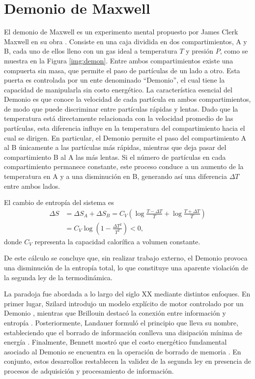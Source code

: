 \section{Demonio de Maxwell}

El demonio de Maxwell es un experimento mental propuesto por James Clerk Maxwell en su obra \cite{Maxwell_1871}. Consiste en una caja dividida en dos compartimientos, A y B, cada uno de ellos lleno con un gas ideal a temperatura $T$ y presión $P$, como se muestra en la Figura \ref{img:demon}. Entre ambos compartimientos existe una compuerta sin masa, que permite el paso de partículas de un lado a otro. Esta puerta es controlada por un ente denominado ``Demonio'', el cual tiene la capacidad de manipularla sin costo energético. La característica esencial del Demonio es que conoce la velocidad de cada partícula en ambos compartimientos, de modo que puede discriminar entre partículas rápidas y lentas. Dado que la temperatura está directamente relacionada con la velocidad promedio de las partículas, esta diferencia influye en la temperatura del compartimiento hacia el cual se dirigen. En particular, el Demonio permite el paso del compartimiento A al B únicamente a las partículas más rápidas, mientras que deja pasar del compartimiento B al A las más lentas. Si el número de partículas en cada compartimiento permanece constante, este proceso conduce a un aumento de la temperatura en A y a una disminución en B, generando así una diferencia $\Delta T$ entre ambos lados.

El cambio de entropía del sistema es
\begin{align*}
    \Delta S & = \Delta S_{A} + \Delta S_{B} = C_{V}\left( \log \frac{T-\Delta T}{T} + \log \frac{T+\Delta T}{T} \right) \\
       & =  C_{V} \log \left( 1 - \frac{\Delta T^{2}}{T^{2}}  \right) < 0,
\end{align*}
donde \( C_V \) representa la capacidad calorífica a volumen constante.

De este cálculo se concluye que, sin realizar trabajo externo, el Demonio provoca una disminución de la entropía total, lo que constituye una aparente violación de la segunda ley de la termodinámica.

La paradoja fue abordada a lo largo del siglo XX mediante distintos enfoques. En primer lugar, Szilard introdujo un modelo explícito de motor controlado por un Demonio \cite{szilard1964decrease}, mientras que Brillouin destacó la conexión entre información y entropía \cite{brillouin1951maxwell}. Posteriormente, Landauer formuló el principio que lleva su nombre, estableciendo que el borrado de información conlleva una disipación mínima de energía \cite{Landauer_1961}. Finalmente, Bennett mostró que el costo energético fundamental asociado al Demonio se encuentra en la operación de borrado de memoria \cite{bennett1982thermodynamics}. En conjunto, estos desarrollos restablecen la validez de la segunda ley en presencia de procesos de adquisición y procesamiento de información.

